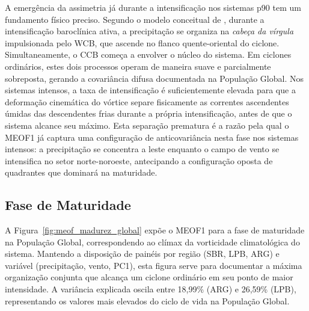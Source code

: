 A emergência da assimetria já durante a intensificação nos sistemas p90 tem um fundamento físico preciso.
Segundo o modelo conceitual de \citet{browning1986conceptual}, durante a intensificação baroclínica ativa, a precipitação se organiza na \textit{cabeça da vírgula} impulsionada pelo WCB, que ascende no flanco quente-oriental do ciclone.
Simultaneamente, o CCB começa a envolver o núcleo do sistema.
Em ciclones ordinários, estes dois processos operam de maneira suave e parcialmente sobreposta, gerando a covariância difusa documentada na População Global.
Nos sistemas intensos, a taxa de intensificação é suficientemente elevada para que a deformação cinemática do vórtice separe fisicamente as correntes ascendentes úmidas das descendentes frias durante a própria intensificação, antes de que o sistema alcance seu máximo.
Esta separação prematura é a razão pela qual o MEOF1 já captura uma configuração de anticovariância nesta fase nos sistemas intensos: a precipitação se concentra a leste enquanto o campo de vento se intensifica no setor norte-noroeste, antecipando a configuração oposta de quadrantes que dominará na maturidade.

\subsection{Fase de Maturidade}
\label{subsec:meof_madurez}

A Figura~\ref{fig:meof_madurez_global} expõe o MEOF1 para a fase de maturidade na População Global, correspondendo ao clímax da vorticidade climatológica do sistema.
Mantendo a disposição de painéis por região (SBR, LPB, ARG) e variável (precipitação, vento, PC1), esta figura serve para documentar a máxima organização conjunta que alcança um ciclone ordinário em seu ponto de maior intensidade.
A variância explicada oscila entre 18,99\% (ARG) e 26,59\% (LPB), representando os valores mais elevados do ciclo de vida na População Global.

